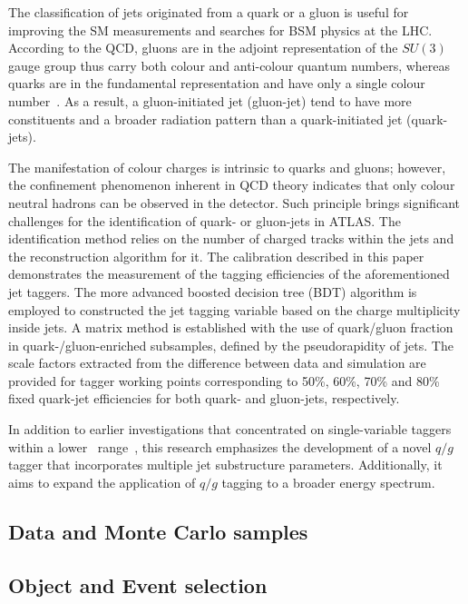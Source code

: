 The classification of jets originated from a quark or a gluon is useful for improving the SM measurements and searches for BSM physics at the LHC.  According to the QCD,  gluons are in the adjoint representation of the $SU(3)$ gauge group thus carry both colour and anti-colour quantum numbers, whereas quarks are in the fundamental representation and have only a single colour number~\cite{ALTARELLI1977298}. As a result, a gluon-initiated jet (gluon-jet) tend to have more constituents and a broader radiation pattern than a quark-initiated jet (quark-jets). 

The manifestation of colour charges is intrinsic to quarks and gluons; however, the confinement phenomenon inherent in QCD theory indicates that only colour neutral hadrons can be observed in the detector. Such principle brings significant challenges for the identification of quark- or gluon-jets in ATLAS. The identification method relies on the number of charged tracks within the jets and the reconstruction algorithm for it. The calibration described in this paper demonstrates the measurement of the tagging efficiencies of the aforementioned jet taggers. The more advanced boosted decision tree (BDT) algorithm is employed to constructed the jet tagging variable based on the charge multiplicity inside jets. A matrix method is established with the use of quark/gluon fraction in quark-/gluon-enriched subsamples, defined by the pseudorapidity of jets. The scale factors extracted from the difference between data and simulation are provided for tagger working points corresponding to 50\%, 60\%, 70\% and 80\% fixed quark-jet efficiencies for both quark- and gluon-jets, respectively.
  

In addition to earlier investigations that concentrated on single-variable taggers within a lower \pt~range~\cite{Aad_2014,ATL-PHYS-PUB-2017-009}, this research emphasizes the development of a novel $q/g$ tagger that incorporates multiple jet substructure parameters. Additionally, it aims to expand the application of $q/g$ tagging to a broader energy spectrum.

\subsection{Data and Monte Carlo samples}
\label{sec:Data-MC}


\subsection{Object and Event selection}
\label{sec:Obj-event}



